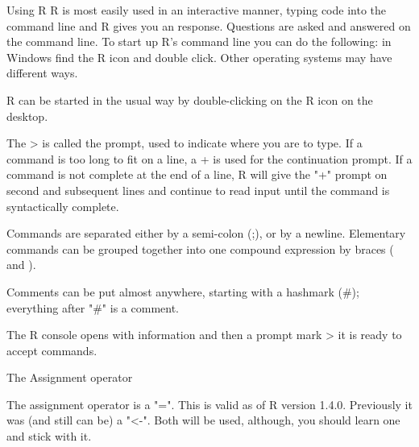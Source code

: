 \begin{frame}

Using R
R is most easily used in an interactive manner, typing code into the command line and R gives you an response. Questions are asked and answered on the command line. To start up R's command line you can do the following: in Windows find the R icon and double click. Other operating systems may have different ways.

R can be started in the usual way by double-clicking on the R icon on the desktop.

\end{frame}
\begin{frame}
The > is called the prompt, used to indicate where you are to type. If a command is too long to fit on a line, a + is used for the continuation prompt.
If a command is not complete at the end of a line, R will give the "+" prompt on second and subsequent lines and continue to read input until the command is syntactically complete.
\end{frame}
\begin{frame}
Commands are separated either by a semi-colon (;), or by a newline. Elementary commands can be grouped together into one compound expression by braces ({ and }). 

Comments can be put almost anywhere, starting with a hashmark (#); everything after "#" is a comment.
\end{frame}
\begin{frame}
The R console opens with information and then a prompt mark  >  it is ready to accept commands.
\end{frame}
\begin{frame}
The Assignment operator

The assignment operator is a "=". This is valid as of R version 1.4.0. Previously it was (and still can be) a "<-".
Both will be used, although, you should learn one and stick with it.
\end{frame}
